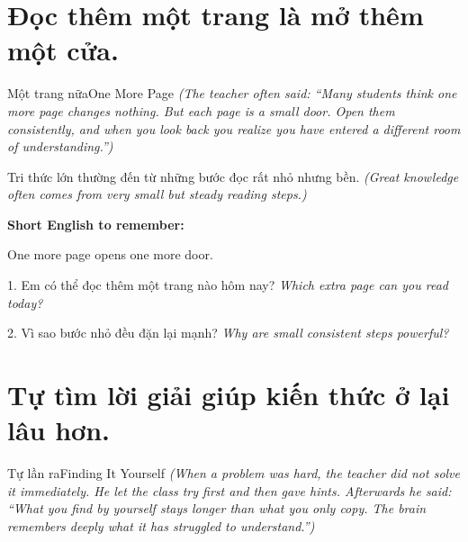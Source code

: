 \section{Đọc thêm một trang là mở thêm một cửa.}
\begin{truyen}{Một trang nữa}{One More Page}
\textit{(The teacher often said: ``Many students think one more page changes nothing. But each page is a small door. Open them consistently, and when you look back you realize you have entered a different room of understanding.'')}
\end{truyen}

\begin{baihoc}
Tri thức lớn thường đến từ những bước đọc rất nhỏ nhưng bền.
\textit{(Great knowledge often comes from very small but steady reading steps.)}
\end{baihoc}

\begin{ghinhoanh}
\textbf{Short English to remember:}

One more page opens one more door.

\end{ghinhoanh}

\begin{tuhocnhanh}
1. Em có thể đọc thêm một trang nào hôm nay? \textit{Which extra page can you read today?}

2. Vì sao bước nhỏ đều đặn lại mạnh? \textit{Why are small consistent steps powerful?}
\end{tuhocnhanh}
\ngancach

\section{Tự tìm lời giải giúp kiến thức ở lại lâu hơn.}
\begin{truyen}{Tự lần ra}{Finding It Yourself}
\textit{(When a problem was hard, the teacher did not solve it immediately. He let the class try first and then gave hints. Afterwards he said: ``What you find by yourself stays longer than what you only copy. The brain remembers deeply what it has struggled to understand.'')}
\end{truyen}

